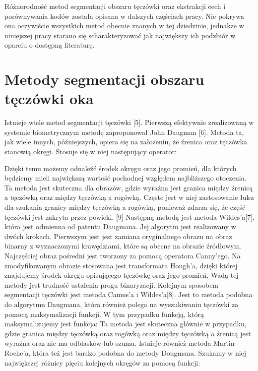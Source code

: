	Różnorodność metod segmentacji obszaru tęczówki oraz ekstrakcji cech i porównywania kodów została opisana w dalszych częściach pracy. Nie pokrywa ona oczywiście wszystkich metod obecnie znanych w tej dziedzinie, jednakże w niniejszej pracy starano się scharakteryzować jak największy ich podzbiór w oparciu o dostępną literaturę.


\section{Metody segmentacji obszaru tęczówki oka}
\label{sec:segmentacja}

Istnieje wiele metod segmentacji tęczówki [5]. Pierwszą efektywnie zrealizowaną w systemie biometrycznym metodę zaproponował John Daugman [6]. Metoda ta, jak wiele innych, późniejszych, opiera się na założeniu, że źrenica oraz tęczówka stanowią okręgi. Stosuje się w niej następujący operator:

Dzięki temu możemy odnaleźć środek okręgu oraz jego promień, dla których będziemy mieli największą wartość pochodnej względem najbliższego otoczenia. Ta metoda jest skuteczna dla obrazów, gdzie wyraźna jest granica między źrenicą a tęczówką oraz między tęczówką a rogówką. Częste jest w niej zastosowanie łuku dla szukania granicy między tęczówką a rogówką, ponieważ zdarza się, że część tęczówki jest zakryta przez powieki. [9]
	Następną metodą jest metoda Wildes'a[7], która jest odmienna od patentu Daugmana. Jej algorytm jest realizowany w dwóch krokach. Pierwszym jest jest zamiana oryginalnego obrazu na obraz binarny z wyznaczonymi krawędziami, które są obecne na obrazie źródłowym. Najczęściej obraz pośredni jest tworzony za pomocą operatora Canny'ego. Na zmodyfikowanym obrazie stosowana jest transformata Hough'a, dzięki której znajdujemy środek okręgu opisującego tęczówkę oraz jego promień. Wadą tej metody jest trudność ustalenia progu binaryzacji.
	Kolejnym sposobem segmentacji tęczówki jest metoda Camus'a i Wildes'a[8]. Jest to metoda podobna do algorytmu Daugmana, która również polega na wyszukiwaniu tęczówki za pomocą maksymalizacji funkcji. W tym przypadku funkcją, którą maksymalizujemy jest funkcja: 
Ta metoda jest skuteczna głównie w przypadku, gdzie granica między tęczówką oraz rogówką oraz między tęczówką a źrenicą jest wyraźna oraz nie ma odblasków lub szumu.
	Istnieje również metoda Martin-Roche'a, która też jest bardzo podobna do metody Dougmana. Szukamy w niej największej różnicy pięciu kolejnych okręgów za pomocą funkcji:















